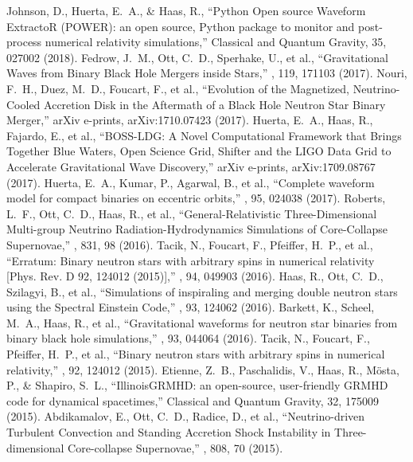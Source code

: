  Johnson, D., Huerta, E.~A., \& Haas, R., ``Python Open source Waveform ExtractoR (POWER): an open source, Python package to monitor and post-process numerical relativity simulations,'' Classical and Quantum Gravity, 35, 027002 (2018).
 Fedrow, J.~M., Ott, C.~D., Sperhake, U., et al., ``Gravitational Waves from Binary Black Hole Mergers inside Stars,'' \prl, 119, 171103 (2017).
 Nouri, F.~H., Duez, M.~D., Foucart, F., et al., ``Evolution of the Magnetized, Neutrino-Cooled Accretion Disk in the Aftermath of a Black Hole Neutron Star Binary Merger,'' arXiv e-prints, arXiv:1710.07423 (2017).
 Huerta, E.~A., Haas, R., Fajardo, E., et al., ``BOSS-LDG: A Novel Computational Framework that Brings Together Blue Waters, Open Science Grid, Shifter and the LIGO Data Grid to Accelerate Gravitational Wave Discovery,'' arXiv e-prints, arXiv:1709.08767 (2017).
 Huerta, E.~A., Kumar, P., Agarwal, B., et al., ``Complete waveform model for compact binaries on eccentric orbits,'' \prd, 95, 024038 (2017).
 Roberts, L.~F., Ott, C.~D., Haas, R., et al., ``General-Relativistic Three-Dimensional Multi-group Neutrino Radiation-Hydrodynamics Simulations of Core-Collapse Supernovae,'' \apj, 831, 98 (2016).
 Tacik, N., Foucart, F., Pfeiffer, H.~P., et al., ``Erratum: Binary neutron stars with arbitrary spins in numerical relativity [Phys. Rev. D 92, 124012 (2015)],'' \prd, 94, 049903 (2016).
 Haas, R., Ott, C.~D., Szilagyi, B., et al., ``Simulations of inspiraling and merging double neutron stars using the Spectral Einstein Code,'' \prd, 93, 124062 (2016).
 Barkett, K., Scheel, M.~A., Haas, R., et al., ``Gravitational waveforms for neutron star binaries from binary black hole simulations,'' \prd, 93, 044064 (2016).
 Tacik, N., Foucart, F., Pfeiffer, H.~P., et al., ``Binary neutron stars with arbitrary spins in numerical relativity,'' \prd, 92, 124012 (2015).
 Etienne, Z.~B., Paschalidis, V., Haas, R., M{\"o}sta, P., \& Shapiro, S.~L., ``IllinoisGRMHD: an open-source, user-friendly GRMHD code for dynamical spacetimes,'' Classical and Quantum Gravity, 32, 175009 (2015).
 Abdikamalov, E., Ott, C.~D., Radice, D., et al., ``Neutrino-driven Turbulent Convection and Standing Accretion Shock Instability in Three-dimensional Core-collapse Supernovae,'' \apj, 808, 70 (2015).
